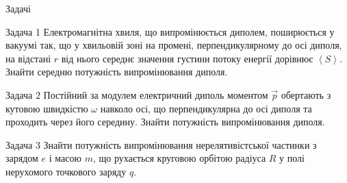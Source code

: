 \documentclass[onlytextwidth]{beamer}
\let\vect\vec
\begin{document}
\begin{frame}[t]{Задачі}{}
	\begin{exampleblock}{Задача 1}\justifying
		Електромагнітна хвиля, що випромінюється диполем, поширюється у вакуумі так, що у хвильовій зоні на промені, перпендикулярному до осі диполя, на відстані $ r $ від нього середнє значення густини потоку енергії дорівнює $ \left\langle S \right\rangle $. Знайти середню потужність випромінювання диполя.
	\end{exampleblock}
	\begin{exampleblock}{Задача 2}\justifying
		Постійний за модулем електричний диполь моментом $ \vect{p} $ обертають з кутовою швидкістю $ \omega $ навколо осі, що перпендикулярна до
		осі диполя та проходить через його середину. Знайти потужність випромінювання диполя.
	\end{exampleblock}
	\begin{exampleblock}{Задача 3}\justifying
		Знайти потужність випромінювання нерелятивістської
		частинки з зарядом $ e $ і масою $ m $, що рухається круговою орбітою радіуса $ R $ у полі нерухомого точкового заряду $ q $.
	\end{exampleblock}
\end{frame}
\end{document}
